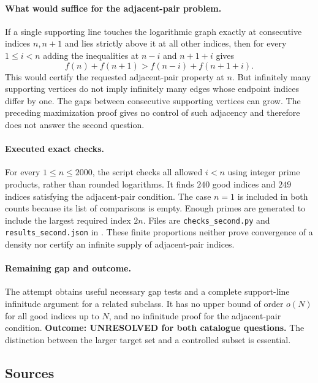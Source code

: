 \documentclass[11pt,a4paper]{article}
\begin{document}
\paragraph{What would suffice for the adjacent-pair problem.}
If a single supporting line touches the logarithmic graph exactly at
consecutive indices $n,n+1$ and lies strictly above it at all other
indices, then for every $1\le i<n$ adding the inequalities at
$n-i$ and $n+1+i$ gives
\[
                  f(n)+f(n+1)>f(n-i)+f(n+1+i).
\]
This would certify the requested adjacent-pair property at $n$.
But infinitely many supporting vertices do not imply infinitely many
edges whose endpoint indices differ by one. The gaps between consecutive
supporting vertices can grow. The preceding maximization proof gives
no control of such adjacency and therefore does not answer the second
question.

\paragraph{Executed exact checks.}
For every $1\le n\le2000$, the script checks all allowed $i<n$
using integer prime products, rather than rounded logarithms. It finds
$240$ good indices and $249$ indices satisfying the adjacent-pair
condition. The case $n=1$ is included in both counts because its list
of comparisons is empty. Enough primes are generated to include the
largest required index $2n$. Files are \texttt{checks\_second.py} and
\texttt{results\_second.json} in
.
These finite proportions neither prove convergence of a density nor
certify an infinite supply of adjacent-pair indices.

\paragraph{Remaining gap and outcome.}
The attempt obtains useful necessary gap tests and a complete support-line
infinitude argument for a related subclass. It has no upper bound of
order $o(N)$ for all good indices up to $N$, and no infinitude proof
for the adjacent-pair condition. \textbf{Outcome: UNRESOLVED for both
catalogue questions.} The distinction between the larger target set
and a controlled subset is essential.

\subsection{Sources}
\end{document}

